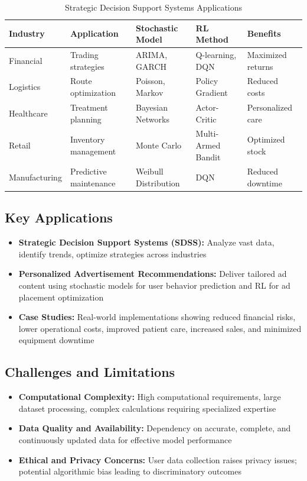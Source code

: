 \begin{table}[h!]
\centering
\caption{Strategic Decision Support Systems Applications}
\begin{tabular}{|l|l|l|l|l|}
\hline
\textbf{Industry} & \textbf{Application} & \textbf{Stochastic Model} & \textbf{RL Method} & \textbf{Benefits} \\
\hline
Financial & Trading strategies & ARIMA, GARCH & Q-learning, DQN & Maximized returns \\
\hline
Logistics & Route optimization & Poisson, Markov & Policy Gradient & Reduced costs \\
\hline
Healthcare & Treatment planning & Bayesian Networks & Actor-Critic & Personalized care \\
\hline
Retail & Inventory management & Monte Carlo & Multi-Armed Bandit & Optimized stock \\
\hline
Manufacturing & Predictive maintenance & Weibull Distribution & DQN & Reduced downtime \\
\hline
\end{tabular}
\end{table}

\subsection*{Key Applications}
\begin{itemize}
    \item \textbf{Strategic Decision Support Systems (SDSS):} Analyze vast data, identify trends, optimize strategies across industries
    \item \textbf{Personalized Advertisement Recommendations:} Deliver tailored ad content using stochastic models for user behavior prediction and RL for ad placement optimization
    \item \textbf{Case Studies:} Real-world implementations showing reduced financial risks, lower operational costs, improved patient care, increased sales, and minimized equipment downtime
\end{itemize}

\subsection*{Challenges and Limitations}
\begin{itemize}
    \item \textbf{Computational Complexity:} High computational requirements, large dataset processing, complex calculations requiring specialized expertise
    \item \textbf{Data Quality and Availability:} Dependency on accurate, complete, and continuously updated data for effective model performance
    \item \textbf{Ethical and Privacy Concerns:} User data collection raises privacy issues; potential algorithmic bias leading to discriminatory outcomes
\end{itemize}

